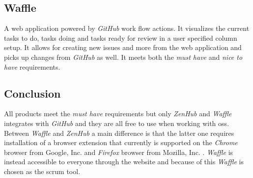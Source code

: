 \subsection*{Waffle}
A web application powered by \textit{GitHub} work flow actions. 
It visualizes the current tasks to do, tasks doing and tasks ready for review in a user specified column setup. 
It allows for creating new issues and more from the web application and picks up changes from \textit{GitHub} as well. 
It meets both the \textit{must have} and \textit{nice to have} requirements.

\subsection*{Conclusion}
All products meet the \textit{must have} requirements but only \textit{ZenHub} and \textit{Waffle} integrates with \textit{GitHub} and they are all free to use when working with \gls{oss}.
Between \textit{Waffle} and \textit{ZenHub} a main difference is that the latter one requires installation of a browser extension that currently is supported on the \textit{Chrome} browser from Google, Inc. and \textit{Firefox} browser from Mozilla, Inc.  \citep{preStudy:scrum:zenhub}.
\textit{Waffle} is instead accessible to everyone through the website and because of this \textit{Waffle} is chosen as the \gls{scrum} tool.
